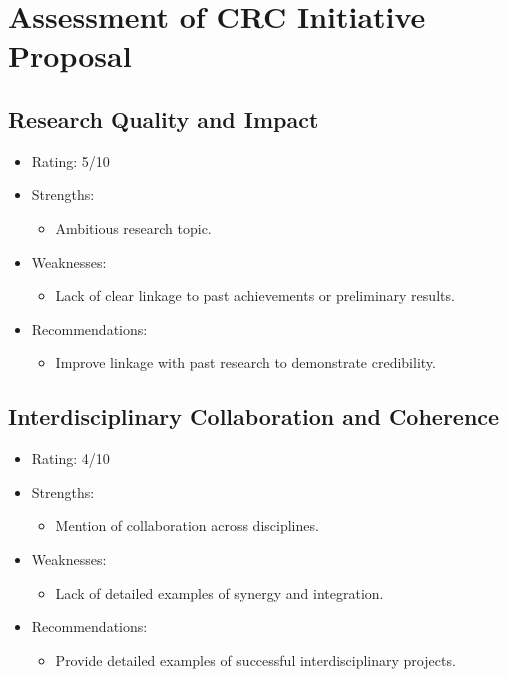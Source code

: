 \documentclass{article}
\begin{document}
\section{Assessment of CRC Initiative Proposal}

\subsection{Research Quality and Impact}
\begin{itemize}
    \item Rating: 5/10
    \item Strengths:
        \begin{itemize}
            \item Ambitious research topic.
        \end{itemize}
    \item Weaknesses:
        \begin{itemize}
            \item Lack of clear linkage to past achievements or preliminary results.
        \end{itemize}
    \item Recommendations:
        \begin{itemize}
            \item Improve linkage with past research to demonstrate credibility.
        \end{itemize}
\end{itemize}

\subsection{Interdisciplinary Collaboration and Coherence}
\begin{itemize}
    \item Rating: 4/10
    \item Strengths:
        \begin{itemize}
            \item Mention of collaboration across disciplines.
        \end{itemize}
    \item Weaknesses:
        \begin{itemize}
            \item Lack of detailed examples of synergy and integration.
        \end{itemize}
    \item Recommendations:
        \begin{itemize}
            \item Provide detailed examples of successful interdisciplinary projects.
        \end{itemize}
\end{itemize}
\end{document}

